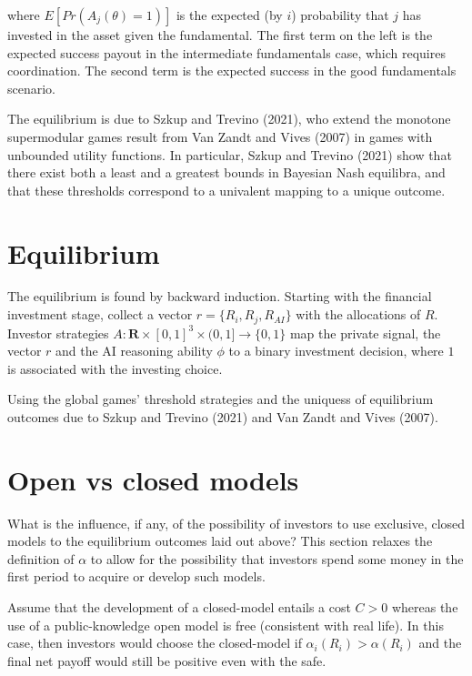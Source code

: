 \documentclass[
]{article}
\theoremstyle{plain}
\theoremstyle{remark}
\begin{document}
where \(E[Pr(A_j(\theta)=1)]\) is the expected (by \(i\)) probability
that \(j\) has invested in the asset given the fundamental. The first
term on the left is the expected success payout in the intermediate
fundamentals case, which requires coordination. The second term is the
expected success in the good fundamentals scenario.

The equilibrium is due to Szkup and Trevino (2021), who extend the
monotone supermodular games result from Van Zandt and Vives (2007) in
games with unbounded utility functions. In particular, Szkup and Trevino
(2021) show that there exist both a least and a greatest bounds in
Bayesian Nash equilibra, and that these thresholds correspond to a
univalent mapping to a unique outcome.

\section{Equilibrium}\label{equilibrium-1}

The equilibrium is found by backward induction. Starting with the
financial investment stage, collect a vector \(r=\{R_i, R_j, R_{AI}\}\)
with the allocations of \(R\). Investor strategies
\(A : \mathbf{R} \times [0,1]^3 \times (0,1]\to \{0,1\}\) map the
private signal, the vector \(r\) and the AI reasoning ability \(\phi\)
to a binary investment decision, where \(1\) is associated with the
investing choice.

Using the global games' threshold strategies and the uniquess of
equilibrium outcomes due to Szkup and Trevino (2021) and Van Zandt and
Vives (2007).

\section{Open vs closed models}\label{sec-closedmodels}

What is the influence, if any, of the possibility of investors to use
exclusive, closed models to the equilibrium outcomes laid out above?
This section relaxes the definition of \(\alpha\) to allow for the
possibility that investors spend some money in the first period to
acquire or develop such models.

Assume that the development of a closed-model entails a cost \(C > 0\)
whereas the use of a public-knowledge open model is free (consistent
with real life). In this case, then investors would choose the
closed-model if \(\alpha_i(R_i) > \alpha(R_i)\) and the final net payoff
would still be positive even with the safe.
\end{document}
